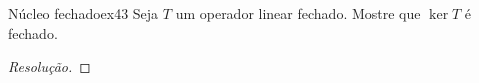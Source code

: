 \begin{exercício}{Núcleo fechado}{ex43}
  Seja \(T\) um operador linear fechado. Mostre que \(\ker{T}\) é fechado.
\end{exercício}
\begin{proof}[Resolução]

\end{proof}
